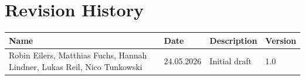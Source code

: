 


\chapter*{Revision History}

\begin{center}
	\begin{tabular}{ |p{4cm}|p{2.5cm}|p{5cm}|p{2cm}| } 
		\hline
		\rowcolor{black!3}
		Name & Date & Description & Version \\ 
		\hline
		Robin Eilers, Matthias Fuchs, Hannah Lindner, Lukas Reil, Nico Tunkowski & 24.05.2026 & Initial draft & 1.0\\ 
		\hline
	\end{tabular}
\end{center}

